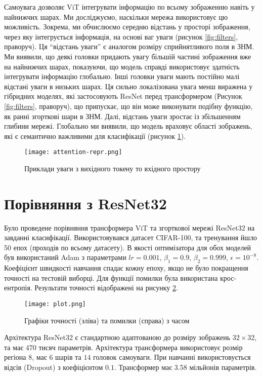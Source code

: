 Самоувага дозволяє ViT інтегрувати інформацію по всьому
зображенню навіть у найнижчих шарах. Ми досліджуємо, наскільки мережа
використовує цю можливість. Зокрема, ми обчислюємо середню
відстань у просторі зображення, через яку інтегрується інформація,
на основі ваг уваги (рисунок \ref{fig:filters}, праворуч).
Ця ``відстань уваги'' є аналогом розміру сприйнятливого поля в ЗНМ.
Ми виявили, що деякі головки придають увагу більшій частині зображення
вже на найнижчих шарах, показуючи, що модель справді
використовує здатність інтегрувати інформацію глобально.
Інші головки уваги мають постійно малі відстані уваги в низьких шарах.
Ця сильно локалізована увага менш виражена у гібридних моделях,
які застосовують ResNet перед трансформером
(Рисунок \ref{fig:filters}, праворуч), що припускає, що він може
виконувати подібну функцію, як ранні згорткові шари в ЗНМ.
Далі, відстань уваги зростає із збільшенням глибини мережі.
Глобально ми виявили, що модель враховує області зображень,
які є семантично важливими для класифікації
(рисунок \ref{fig:attention-repr}).

\begin{figure}[H]
    \centering
    \texttt{[image: attention-repr.png]}
    \caption{Приклади уваги з вихідного токену то вхідного простору}
    \label{fig:attention-repr}
\end{figure}

\section{Порівняння з ResNet32}
Було проведене порівняння трансформера ViT та
згорткової мережі ResNet32 на завданні класифікації.
Використовувався датасет CIFAR-100, та тренування
йшло 50 епох (проходів по всьому датасету).
В якості оптимізатора для обох моделей був використаний Adam з параметрами
$lr=0.001$, $\beta_1 = 0.9$, $\beta_2 = 0.999$, $\epsilon = 10^{-8}$.
Коефіцієнт швидкості навчання спадає кожну епоху, якщо не було
покращення точності на тестовій виборці. Для функції помилки
була використана крос-ентропія. Результати точності
відображені на рисунку \ref{fig:cmp-vit-resnet}.

\begin{figure}[H]
    \centering
    \texttt{[image: plot.png]}
    \caption{Графіки точності (зліва) та помилки (справа) з часом}
    \label{fig:cmp-vit-resnet}
\end{figure}

Архітектура ResNet32 є стандартною адаптованою до розміру
зображень $32\times32$, та має 470 тисяч параметрів.
Архітектура трансформера використовує розмір регіона $8$,
має $6$ шарів та $14$ головок самоуваги. При навчанні використовується
відсів (Dropout) з коефіцієнтом $0.1$.
Трансформер має 3.58 мільйонів параметрів.

